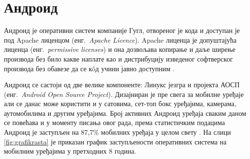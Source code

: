 \documentclass[12pt,oneside]{memoir}
\theoremstyle{remark}
\begin{document}






\chapter{Андроид}
\label{chp:android}
Андроид је оперативни систем компаније Гугл, отвореног је кода и доступан је под Apache лиценцом  (енг.~{\em Apache Licence}). Apache лиценца је допуштајућа лиценца (енг.~{\em permissive licenses}) и она дозвољава копирање и даље ширење производа без било какве наплате као и дистрибуцију изведеног софтверског производа без обавезе да се к\^{o}д учини јавно доступним \cite{apache,aospapache}.

Андроид се састоји од две велике компоненте: Линукс језгра и пројекта АОСП (енг.~{\em Android Open Source Project}). Дизајниран је пре свега за мобилне уређаје али се данас може користити и у сатовима, сет-топ бокс уређајима, камерама, аутомобилима и другим уређајима. Број активних Андроид уређаја сваким даном се повећава и у моменту писања овог рада, према статистичким подацима Андроид је заступљен на 87,7\% мобилних уређаја у целом свету \cite{marketshare}. На слици \ref{fig:grafikrasta} је приказан график заступљености оперативних система на мобилним уређајима у претходних 8 година.
\end{document}

